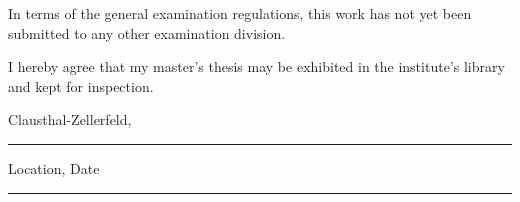 \noindent
In terms of the general examination regulations, this work has not yet been submitted to any other examination division.
\vspace{7.5ex}

\noindent
I hereby agree that my master's thesis may be exhibited in the institute's library and kept for inspection.

\makeatletter
\vspace{15ex}
\parbox{0.475\textwidth}{\centering Clausthal-Zellerfeld, {\britishdate{}} \hrule\strut\centering\footnotesize Location, Date} \hfill
\parbox{0.475\textwidth}{ \hrule\strut\centering\footnotesize \@author}
\makeatother
\vfill
